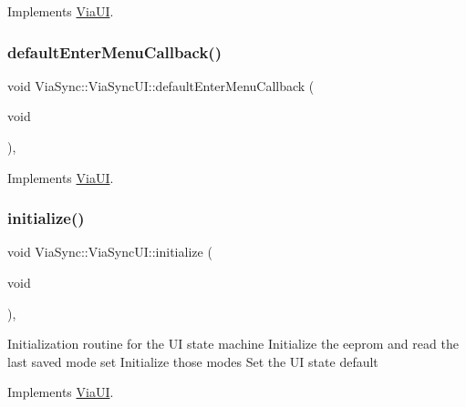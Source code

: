 Implements \mbox{\hyperlink{class_via_u_i_a8a6bf29d336faa8e9d026a84be45d956}{Via\+UI}}.

\mbox{\label{class_via_sync_1_1_via_sync_u_i_a53dbd5157906ae81c3d54a56eafbf06e}} 
\subsubsection{\texorpdfstring{default\+Enter\+Menu\+Callback()}{defaultEnterMenuCallback()}}
{\footnotesize\ttfamily void Via\+Sync\+::\+Via\+Sync\+U\+I\+::default\+Enter\+Menu\+Callback (\begin{DoxyParamCaption}\item[{void}]{ }\end{DoxyParamCaption})\hspace{0.3cm}{\ttfamily [override]}, {\ttfamily [virtual]}}



Implements \mbox{\hyperlink{class_via_u_i_a226eb7b65b6035a611dd734d965fa7c2}{Via\+UI}}.

\mbox{\label{class_via_sync_1_1_via_sync_u_i_a0d9dbe5a0b663acc88b45b46f440db78}} 
\subsubsection{\texorpdfstring{initialize()}{initialize()}}
{\footnotesize\ttfamily void Via\+Sync\+::\+Via\+Sync\+U\+I\+::initialize (\begin{DoxyParamCaption}\item[{void}]{ }\end{DoxyParamCaption})\hspace{0.3cm}{\ttfamily [override]}, {\ttfamily [virtual]}}

Initialization routine for the UI state machine Initialize the eeprom and read the last saved mode set Initialize those modes Set the UI state default 

Implements \mbox{\hyperlink{class_via_u_i_a573ba7aef8f4982ec4900258c770bdbb}{Via\+UI}}.

